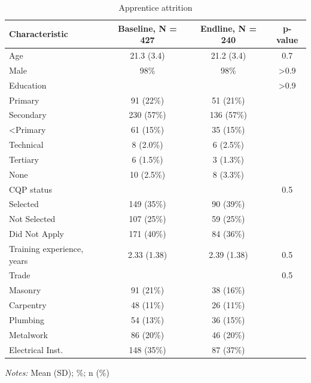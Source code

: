 \documentclass[
  a4paper, twoside, 12pt]{book}
\begin{document}
\begin{singlespacing}
\begin{table}[H]
\caption{\label{tab:tbl-attritionapps}Apprentice attrition}
\centering
\fontsize{9}{11}\selectfont
\begin{threeparttable}
\begin{tabular}[t]{lccc}
\toprule
\textbf{Characteristic} & \textbf{Baseline}, N = 427 & \textbf{Endline}, N = 240 & \textbf{p-value}\\
\midrule
Age & 21.3 (3.4) & 21.2 (3.4) & 0.7\\
Male & 98\% & 98\% & >0.9\\
Education &  &  & >0.9\\
\hspace{1em}Primary & 91 (22\%) & 51 (21\%) & \\
\hspace{1em}Secondary & 230 (57\%) & 136 (57\%) & \\
\hspace{1em}<Primary & 61 (15\%) & 35 (15\%) & \\
\hspace{1em}Technical & 8 (2.0\%) & 6 (2.5\%) & \\
\hspace{1em}Tertiary & 6 (1.5\%) & 3 (1.3\%) & \\
\hspace{1em}None & 10 (2.5\%) & 8 (3.3\%) & \\
CQP status &  &  & 0.5\\
\hspace{1em}Selected & 149 (35\%) & 90 (39\%) & \\
\hspace{1em}Not Selected & 107 (25\%) & 59 (25\%) & \\
\hspace{1em}Did Not Apply & 171 (40\%) & 84 (36\%) & \\
Training experience, years & 2.33 (1.38) & 2.39 (1.38) & 0.5\\
Trade &  &  & 0.5\\
\hspace{1em}Masonry & 91 (21\%) & 38 (16\%) & \\
\hspace{1em}Carpentry & 48 (11\%) & 26 (11\%) & \\
\hspace{1em}Plumbing & 54 (13\%) & 36 (15\%) & \\
\hspace{1em}Metalwork & 86 (20\%) & 46 (20\%) & \\
\hspace{1em}Electrical Inst. & 148 (35\%) & 87 (37\%) & \\
\bottomrule
\end{tabular}
\begin{tablenotes}
\item \textit{Notes:} Mean (SD); \%; n (\%)
\end{tablenotes}
\end{threeparttable}
\end{table}




\end{singlespacing}
\end{document}
